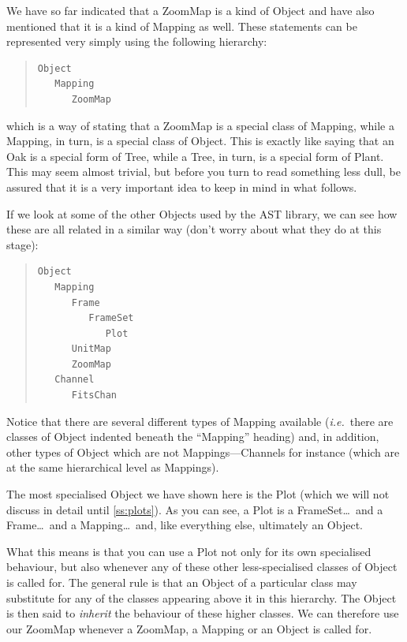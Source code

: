 \documentclass[twoside,11pt]{article}
\newcommand{\htmlref}[2]{#1}
\newcommand{\secref}[1]{\S\ref{#1}}
\renewcommand{\secref}[1]{\ref{#1}}
\begin{document}
We have so far indicated that a ZoomMap is a kind of Object and have
also mentioned that it is a kind of \htmlref{Mapping}{Mapping} as well. These statements
can be represented very simply using the following hierarchy:

\begin{quote}
\small
\begin{verbatim}
Object
   Mapping
      ZoomMap
\end{verbatim}
\normalsize
\end{quote}

which is a way of stating that a ZoomMap is a special class of
Mapping, while a Mapping, in turn, is a special class of Object.  This
is exactly like saying that an Oak is a special form of Tree, while a
Tree, in turn, is a special form of Plant. This may seem almost
trivial, but before you turn to read something less dull, be assured
that it is a very important idea to keep in mind in what follows.

If we look at some of the other Objects used by the AST library, we
can see how these are all related in a similar way (don't worry about
what they do at this stage):
\label{ss:mappinghierarchy}

\begin{quote}
\small
\begin{verbatim}
Object
   Mapping
      Frame
         FrameSet
            Plot
      UnitMap
      ZoomMap
   Channel
      FitsChan
\end{verbatim}
\normalsize
\end{quote}

Notice that there are several different types of Mapping available
({\em{i.e.}}\ there are classes of Object indented beneath the
``Mapping'' heading) and, in addition, other types of Object which are
not Mappings---Channels for instance (which are at the same
hierarchical level as Mappings).

The most specialised Object we have shown here is the \htmlref{Plot}{Plot} (which we
will not discuss in detail until \secref{ss:plots}). As you can see, a
Plot is a \htmlref{FrameSet}{FrameSet}\ldots\ and a \htmlref{Frame}{Frame}\ldots\ and a Mapping\ldots\ and,
like everything else, ultimately an Object.

What this means is that you can use a Plot not only for its own
specialised behaviour, but also whenever any of these other
less-specialised classes of Object is called for. The general rule is
that an Object of a particular class may substitute for any of the
classes appearing above it in this hierarchy. The Object is then said
to {\em{inherit}} the behaviour of these higher classes. We can
therefore use our ZoomMap whenever a ZoomMap, a Mapping or an Object
is called for.
\end{document}
